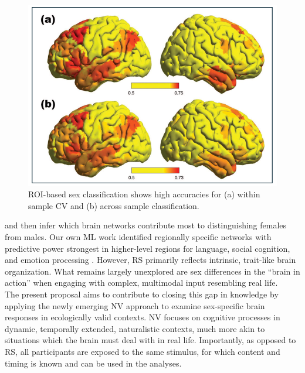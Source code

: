 \documentclass[11pt,a4paper]{article}
\begin{document}
\begin{figure} %
  \vspace{-10pt} %
  \includegraphics[width=\linewidth]{sex_classification.png}
  \caption{ROI-based sex classification shows high accuracies for (a) within sample CV and (b) across sample classification.}
  \label{fig:sexclass}
\end{figure}
and then infer which brain networks contribute most to distinguishing females from males.
Our own ML work identified regionally specific networks with predictive power strongest in higher-level regions 
for language, social cognition, and emotion processing \parencite{weisSexClassificationResting2020a,wierschAccurateSexPrediction2023a,wierschSexDifferencesBrain2021a}.
However, RS primarily reflects intrinsic, trait-like brain organization. What remains largely unexplored are 
sex differences in the “brain in action” when engaging with complex, multimodal input resembling real life.\\ 
The present proposal aims to contribute to closing this gap in knowledge by applying the newly 
emerging NV approach to examine sex-specific brain responses in ecologically valid contexts. 
NV focuses on cognitive processes in dynamic, temporally extended, naturalistic contexts, much more akin to
situations which the brain must deal with in real life.
Importantly, as opposed to RS, all participants are exposed to the same stimulus, 
for which content and timing 
is known and can be used in the analyses.
\par\vspace{-\parskip}\noindent %
\end{document}

